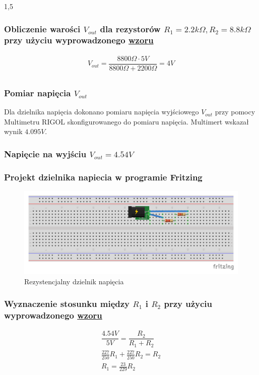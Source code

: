 \documentclass[polish,polish,a4paper]{article}
\begin{document}
\begin{spacing}{1,5}
		\subsubsection*{Obliczenie warości $ V_{out}$ dla rezystorów $ R_{1} = 2.2k\Omega, R_{2} =8.8k\Omega  $  przy użyciu wyprowadzonego \hyperref[eq:vout]{wzoru}}
		\begin{gather*}
		V_{out} = \dfrac{8800\Omega \cdot 5V}{8800\Omega + 2200\Omega} = 4 V\\
		\end{gather*}
		\subsubsection*{Pomiar napięcia $ V_{out} $}
		Dla dzielnika napięcia dokonano pomiaru napięcia wyjściowego $ V_{out} $ przy pomocy Multimetru RIGOL skonfigurowanego do pomiaru napięcia. Multimert wskazał wynik $4.095V$.
		
		
		\subsubsection{Napięcie na wyjściu $V_{out} =  4.54V $}
		\subsubsection*{Projekt dzielnika napiecia w programie Fritzing}
		
		\begin{figure}[H]
			\centering
			\includegraphics[scale=0.9]{4_54_bb.pdf}
			\caption{Rezystencjalny dzielnik napięcia}
			\label{fig:pod4_54}
		\end{figure}
		
		\subsubsection*{Wyznaczenie stosunku między $ R_{1} $ i $ R_{2} $ przy użyciu wyprowadzonego \hyperref[eq:vout]{wzoru}}
		\begin{gather*}
		\dfrac{4.54V}{5V} = \dfrac{R_{2}}{R_{1} + R_{2}}\\
		\frac{227}{250} R_{1} + \frac{227}{250}R_{2} = R_{2}\\
		R_{1} =\frac{23}{229} R_{2}\\
		\end{gather*}

\end{spacing}
\end{document}
